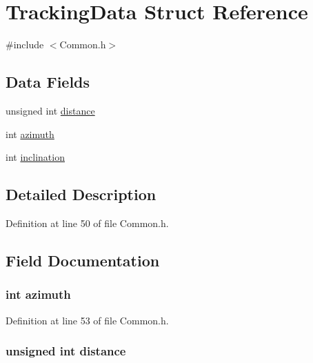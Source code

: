 \hypertarget{struct_tracking_data}{\section{Tracking\+Data Struct Reference}
\label{struct_tracking_data}
}


{\ttfamily \#include $<$Common.\+h$>$}

\subsection*{Data Fields}
\begin{DoxyCompactItemize}
\item 
unsigned int \hyperlink{struct_tracking_data_a4bb47863775a37236bda65273c01b275}{distance}
\item 
int \hyperlink{struct_tracking_data_a866e78e12cb32dcaf1ded89bda8be8f5}{azimuth}
\item 
int \hyperlink{struct_tracking_data_af308b9934394c8bcf7614eb1df2d863f}{inclination}
\end{DoxyCompactItemize}


\subsection{Detailed Description}


Definition at line 50 of file Common.\+h.



\subsection{Field Documentation}
\hypertarget{struct_tracking_data_a866e78e12cb32dcaf1ded89bda8be8f5}{
\subsubsection[{azimuth}]{\setlength{\rightskip}{0pt plus 5cm}int azimuth}}\label{struct_tracking_data_a866e78e12cb32dcaf1ded89bda8be8f5}


Definition at line 53 of file Common.\+h.

\hypertarget{struct_tracking_data_a4bb47863775a37236bda65273c01b275}{
\subsubsection[{distance}]{\setlength{\rightskip}{0pt plus 5cm}unsigned int distance}}\label{struct_tracking_data_a4bb47863775a37236bda65273c01b275}


